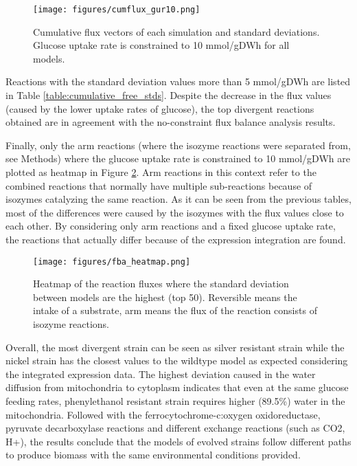 \begin{figure}[H]
  \begin{center}
  \texttt{[image: figures/cumflux\_gur10.png]}
  \caption[Cumulative flux vectors of each experiment when glucose uptake rate is constrained]{Cumulative flux vectors of each simulation and standard deviations. Glucose uptake rate is constrained to 10 mmol/gDWh for all models. }
  \label{fig:cumflux_gur10}
  \end{center}
\end{figure}

Reactions with the standard deviation values more than 5 mmol/gDWh are listed in Table \ref{table:cumulative_free_stds}. Despite the decrease in the flux values (caused by the lower uptake rates of glucose), the top divergent reactions obtained are in agreement with the no-constraint flux balance analysis results.



Finally, only the arm reactions (where the isozyme reactions were separated from, see Methods) where the glucose uptake rate is constrained to 10 mmol/gDWh are plotted as heatmap in Figure \ref{fig:fba_heatmap}. Arm reactions in this context refer to the combined reactions that normally have multiple sub-reactions because of isozymes catalyzing the same reaction. As it can be seen from the previous tables, most of the differences were caused by the isozymes with the flux values close to each other. By considering only arm reactions and a fixed glucose uptake rate, the reactions that actually differ because of the expression integration are found.

\begin{figure}[H]
  \begin{center}
  \texttt{[image: figures/fba\_heatmap.png]}
  \caption[Heatmap of the reaction fluxes where the standard deviation between models are the highest (top 50). Reversible means the intake of a substrate, arm means the flux of the reaction consists of isozyme reactions]{Heatmap of the reaction fluxes where the standard deviation between models are the highest (top 50). Reversible means the intake of a substrate, arm means the flux of the reaction consists of isozyme reactions.}
  \label{fig:fba_heatmap}
  \end{center}
\end{figure}

Overall, the most divergent strain can be seen as silver resistant strain while the nickel strain has the closest values to the wildtype model as expected considering the integrated expression data. The highest deviation caused in the water diffusion from mitochondria to cytoplasm indicates that even at the same glucose feeding rates, phenylethanol resistant strain requires higher (89.5\%) water in the mitochondria. Followed with the ferrocytochrome-c:oxygen oxidoreductase, pyruvate decarboxylase reactions and different exchange reactions (such as CO2, H+), the results conclude that the models of evolved strains follow different paths to produce biomass with the same environmental conditions provided.


